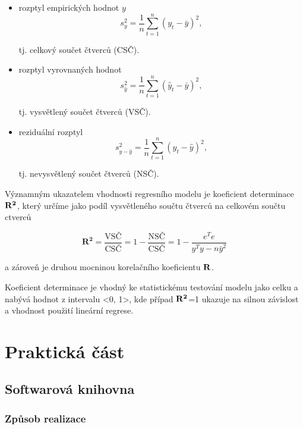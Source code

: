\documentclass[a4paper,12pt,twoside]{scrreprt}
\begin{document}
\begin{itemize}
\item rozptyl empirických hodnot $y$
\begin{equation}
s^{2}_y = \frac{1}{n}\sum_{t=1}^{n}(y_t - \bar{y})^2,
\end{equation}

tj. celkový součet čtverců (CSČ).

\item rozptyl vyrovnaných hodnot
\begin{equation}
s^{2}_{\hat{y}} = \frac{1}{n}\sum_{t=1}^{n}(\hat{y}_t - \bar{y})^2,
\end{equation}

tj. vysvětlený součet čtverců (VSČ).

\item reziduální rozptyl
\begin{equation}
s^{2}_{y-\hat{y}} = \frac{1}{n}\sum_{t=1}^{n}(y_t - \hat{y})^2,
\end{equation}

tj. nevysvětlený součet čtverců (NSČ).
\end{itemize}

Významným ukazatelem vhodnosti regresního modelu je koeficient determinace $\bf{R^2}$, který určíme jako podíl vysvětleného součtu čtverců na celkovém součtu ctverců

\begin{equation}
\mathbf{R^2} = \frac{\text{VSČ}}{\text{CSČ}} = 1 - \frac{\text{NSČ}}{\text{CSČ}} = 1 - \frac{e^Te}{y^Ty - n\bar{y}^2}
\end{equation}

a zároveň je druhou mocninou korelačního koeficientu $\bf{R}$. 

Koeficient determinace je vhodný ke statistickému testování modelu jako celku a nabývá hodnot z intervalu <0, 1>, kde případ $\bf{R}^2$=1 ukazuje na silnou závislost a vhodnost použití lineární regrese. \cite{fiala} 

\chapter{Praktická část}
\section{Softwarová knihovna}
\subsection{Způsob realizace}
\end{document}
